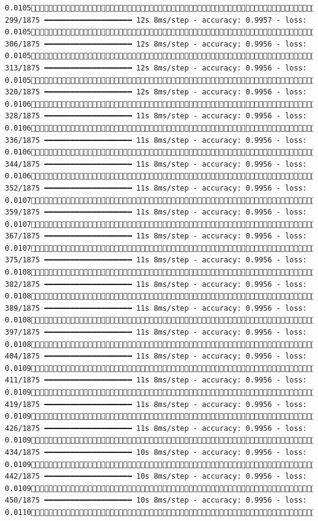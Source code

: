 \documentclass[
  letterpaper,
  DIV=11,
  numbers=noendperiod]{scrreprt}
\begin{document}
\begin{verbatim}
0.0105 299/1875 ━━━━━━━━━━━━━━━━━━━━ 12s 8ms/step - accuracy: 0.9957 - loss: 0.0105 306/1875 ━━━━━━━━━━━━━━━━━━━━ 12s 8ms/step - accuracy: 0.9956 - loss: 0.0105 313/1875 ━━━━━━━━━━━━━━━━━━━━ 12s 8ms/step - accuracy: 0.9956 - loss: 0.0105 320/1875 ━━━━━━━━━━━━━━━━━━━━ 12s 8ms/step - accuracy: 0.9956 - loss: 0.0106 328/1875 ━━━━━━━━━━━━━━━━━━━━ 11s 8ms/step - accuracy: 0.9956 - loss: 0.0106 336/1875 ━━━━━━━━━━━━━━━━━━━━ 11s 8ms/step - accuracy: 0.9956 - loss: 0.0106 344/1875 ━━━━━━━━━━━━━━━━━━━━ 11s 8ms/step - accuracy: 0.9956 - loss: 0.0106 352/1875 ━━━━━━━━━━━━━━━━━━━━ 11s 8ms/step - accuracy: 0.9956 - loss: 0.0107 359/1875 ━━━━━━━━━━━━━━━━━━━━ 11s 8ms/step - accuracy: 0.9956 - loss: 0.0107 367/1875 ━━━━━━━━━━━━━━━━━━━━ 11s 8ms/step - accuracy: 0.9956 - loss: 0.0107 375/1875 ━━━━━━━━━━━━━━━━━━━━ 11s 8ms/step - accuracy: 0.9956 - loss: 0.0108 382/1875 ━━━━━━━━━━━━━━━━━━━━ 11s 8ms/step - accuracy: 0.9956 - loss: 0.0108 389/1875 ━━━━━━━━━━━━━━━━━━━━ 11s 8ms/step - accuracy: 0.9956 - loss: 0.0108 397/1875 ━━━━━━━━━━━━━━━━━━━━ 11s 8ms/step - accuracy: 0.9956 - loss: 0.0108 404/1875 ━━━━━━━━━━━━━━━━━━━━ 11s 8ms/step - accuracy: 0.9956 - loss: 0.0109 411/1875 ━━━━━━━━━━━━━━━━━━━━ 11s 8ms/step - accuracy: 0.9956 - loss: 0.0109 419/1875 ━━━━━━━━━━━━━━━━━━━━ 11s 8ms/step - accuracy: 0.9956 - loss: 0.0109 426/1875 ━━━━━━━━━━━━━━━━━━━━ 11s 8ms/step - accuracy: 0.9956 - loss: 0.0109 434/1875 ━━━━━━━━━━━━━━━━━━━━ 10s 8ms/step - accuracy: 0.9956 - loss: 0.0109 442/1875 ━━━━━━━━━━━━━━━━━━━━ 10s 8ms/step - accuracy: 0.9956 - loss: 0.0109 450/1875 ━━━━━━━━━━━━━━━━━━━━ 10s 8ms/step - accuracy: 0.9956 - loss: 0.0110 
\end{verbatim}
\end{document}
